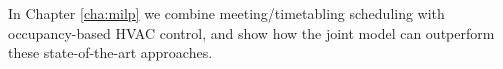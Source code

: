 In Chapter \ref{cha:milp} we combine meeting/timetabling scheduling with occupancy-based HVAC control, and show how the joint model can outperform these state-of-the-art approaches.






